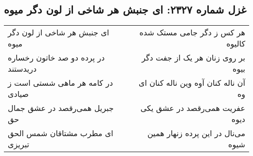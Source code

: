 \begin{center}
\section*{غزل شماره ۲۳۲۷: ای جنبش هر شاخی از لون دگر میوه}
\label{sec:2327}
\begin{longtable}{l p{0.5cm} r}
ای جنبش هر شاخی از لون دگر میوه
&&
هر کس ز دگر جامی مستک شده کالیوه
\\
در پرده دو صد خاتون رخساره دریدستند
&&
بر روی زنان هر یک از جفت دگر بیوه
\\
در کامه هر ماهی شستی است ز صیادی
&&
آن ناله کنان آوه وین ناله کنان ای وه
\\
جبریل همی‌رقصد در عشق جمال حق
&&
عفریت همی‌رقصد در عشق یکی دیوه
\\
ای مطرب مشتاقان شمس الحق تبریزی
&&
می‌نال در این پرده زنهار همین شیوه
\\
\end{longtable}
\end{center}

